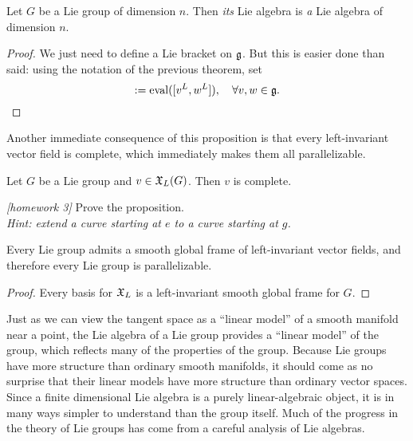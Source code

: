 \begin{corollary}
  Let $G$ be a Lie group of dimension $n$.
  Then \emph{its} Lie algebra is \emph{a} Lie algebra of dimension $n$.
\end{corollary}
\begin{proof}
  We just need to define a Lie bracket on $\mathfrak{g}$.
  But this is easier done than said: using the notation of the previous theorem, set
  \begin{equation}
    [v,w] := \mathrm{eval}([v^L, w^L]), \quad \forall v,w\in\fg.
  \end{equation}
\end{proof}

Another immediate consequence of this proposition is that every left-invariant vector field is complete, which immediately makes them all parallelizable.

\begin{proposition}\label{prop:XLcomplete}
  Let $G$ be a Lie group and $v\in\mathfrak{X}_L(G)$.
  Then $v$ is complete.
\end{proposition}
\begin{exercise}\textit{[homework 3]}
  Prove the proposition.\\  
  \textit{\small Hint: extend a curve starting at $e$ to a curve starting at $g$.}
\end{exercise}

\begin{corollary}
  Every Lie group admits a smooth global frame of  left-invariant vector fields, and therefore every Lie group is parallelizable.
\end{corollary}
\begin{proof}
  Every basis for $\mathfrak{X}_L$ is a left-invariant smooth global frame for $G$.
\end{proof}

Just as we can view the tangent space as a ``linear model'' of a smooth manifold near a point, the Lie algebra of a Lie group provides a ``linear model'' of the group, which reflects many of the properties of the group.
Because Lie groups have more structure than ordinary smooth manifolds, it should come as no surprise that their linear models have more structure than ordinary vector spaces.
Since a finite dimensional Lie algebra is a purely linear-algebraic object, it is in many ways simpler to understand than the group itself.
Much of the progress in the theory of Lie groups has come from a careful analysis of Lie algebras.

